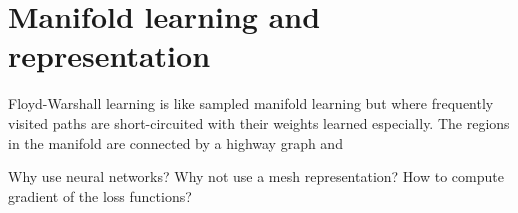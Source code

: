 \section{Manifold learning and representation}
Floyd-Warshall learning is like sampled manifold learning but where frequently visited paths are short-circuited with their weights learned especially.
The regions in the manifold are connected by a highway graph and 

Why use neural networks? Why not use a mesh representation? How to compute gradient of the loss functions?
